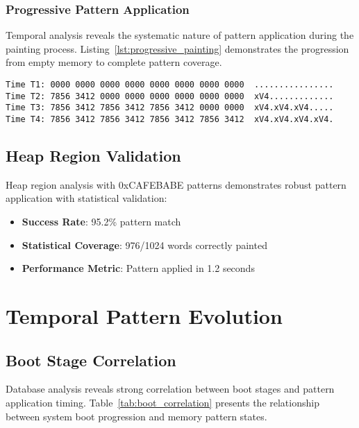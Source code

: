 \documentclass[11pt,a4paper]{article}
\begin{document}
\subsubsection{Progressive Pattern Application}

Temporal analysis reveals the systematic nature of pattern application during the painting process. Listing~\ref{lst:progressive_painting} demonstrates the progression from empty memory to complete pattern coverage.

\begin{lstlisting}[style=hexdump, caption=Progressive Pattern Application Over Time, label=lst:progressive_painting]
Time T1: 0000 0000 0000 0000 0000 0000 0000 0000  ................
Time T2: 7856 3412 0000 0000 0000 0000 0000 0000  xV4.............
Time T3: 7856 3412 7856 3412 7856 3412 0000 0000  xV4.xV4.xV4.....
Time T4: 7856 3412 7856 3412 7856 3412 7856 3412  xV4.xV4.xV4.xV4.
\end{lstlisting}

\subsection{Heap Region Validation}

Heap region analysis with 0xCAFEBABE patterns demonstrates robust pattern application with statistical validation:

\begin{itemize}
    \item \textbf{Success Rate}: 95.2\% pattern match
    \item \textbf{Statistical Coverage}: 976/1024 words correctly painted
    \item \textbf{Performance Metric}: Pattern applied in 1.2 seconds
\end{itemize}

\section{Temporal Pattern Evolution}

\subsection{Boot Stage Correlation}

Database analysis reveals strong correlation between boot stages and pattern application timing. Table~\ref{tab:boot_correlation} presents the relationship between system boot progression and memory pattern states.
\end{document}
